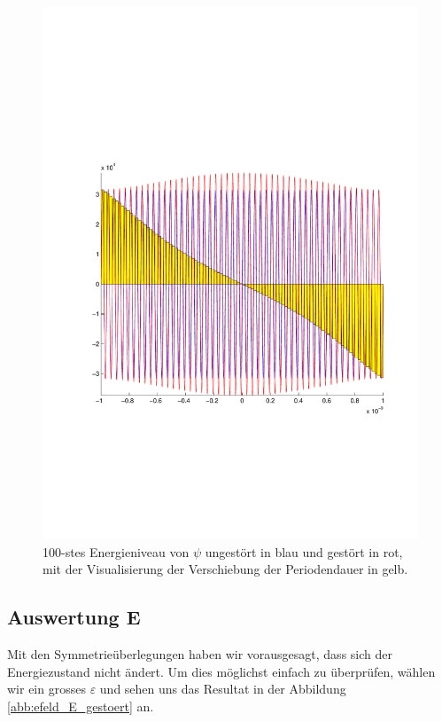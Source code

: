 \begin{refsection}
\begin{figure}
 \centering
 \includegraphics[width=12cm,clip=true,trim=2cm 7cm 1cm 8cm]{efeld/Psi_100_gestoert.pdf}
 \caption{100-stes Energieniveau von $\psi$ ungest\"ort in blau und gest\"ort in rot, 
          mit der Visualisierung der Verschiebung der Periodendauer in gelb.}
 \label{abb:efeld_psi_100_gestoert}
\end{figure}




\subsection{Auswertung E}

Mit den Symmetrie\"uberlegungen haben wir vorausgesagt, dass sich der Energiezustand nicht \"andert.
Um dies m\"oglichst einfach zu \"uberpr\"ufen, w\"ahlen wir ein grosses $\varepsilon$ und sehen uns das Resultat in der 
Abbildung \ref{abb:efeld_E_gestoert} an.


\end{refsection}
